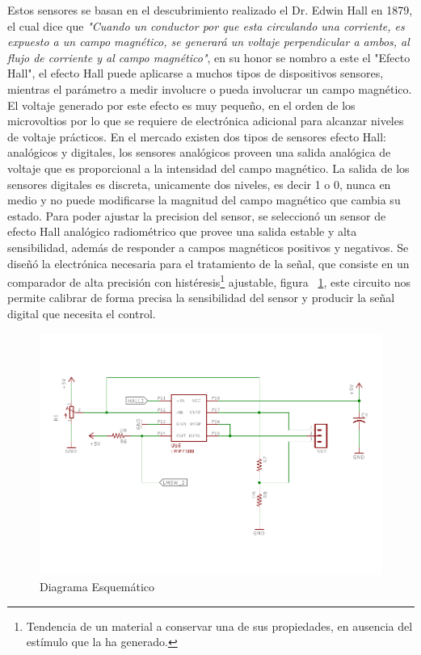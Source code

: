 Estos sensores se basan en el descubrimiento realizado el Dr. Edwin Hall en 1879, el cual dice que \textit{"Cuando un conductor por que esta circulando una corriente, es expuesto a un campo magn\'{e}tico, se generar\'{a} un voltaje perpendicular a ambos, al flujo de corriente y al campo magn\'{e}tico"}, en su honor se nombro a este el "Efecto Hall", el efecto Hall puede aplicarse a muchos tipos de dispositivos sensores, mientras el par\'{a}metro a medir involucre o pueda involucrar un campo magn\'{e}tico. El voltaje generado por este efecto es muy peque\~{n}o, en el orden de los microvoltios por lo que se requiere de electr\'{o}nica adicional para alcanzar niveles de voltaje pr\'{a}cticos. En el mercado existen dos tipos de sensores efecto Hall: anal\'{o}gicos y digitales, los sensores anal\'{o}gicos proveen una salida anal\'{o}gica de voltaje que es proporcional a la intensidad del campo magn\'{e}tico. La salida de los sensores digitales es discreta, unicamente dos niveles, es decir 1 o 0, nunca en medio y no puede modificarse la magnitud del campo magn\'{e}tico que cambia su estado. Para poder ajustar la precision del sensor, se seleccion\'{o} un sensor de efecto Hall anal\'{o}gico radiom\'{e}trico que provee una salida estable y alta sensibilidad, adem\'{a}s de responder a campos magn\'{e}ticos positivos y negativos. Se dise\~{n}\'{o} la electr\'{o}nica necesaria para el tratamiento de la se\~{n}al, que consiste en un comparador de alta precisi\'{o}n con hist\'{e}resis\footnote{Tendencia de un material a conservar una de sus propiedades, en ausencia del est\'{i}mulo que la ha generado.} ajustable, figura ~\ref{fig:EsqTilt}, este circuito nos permite calibrar de forma precisa la sensibilidad del sensor y producir la se\~{n}al digital que necesita el control.  

\begin{figure}[H]
\centering \includegraphics[trim = 0mm 15mm 0mm 15mm]{img/diagram1.pdf}
\caption{Diagrama Esquem\'{a}tico }
\label{fig:EsqTilt}
\end{figure} 

